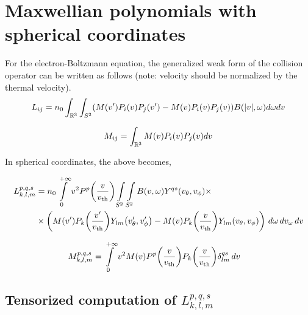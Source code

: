 \documentclass{article}
\newcommand{\myint}{\int\limits}
\newcommand{\diff}[1]{\, d#1}
\newcommand{\of}[1]{\mleft( #1 \mright)}
\newcommand{\vth}{v_\textrm{th}}
\begin{document}

\section{Maxwellian polynomials with spherical coordinates}

For the electron-Boltzmann equation, the generalized weak form of the collision operator can be written as follows (note: velocity should be normalized by the thermal velocity).
\begin{equation}
    L_{ij} = n_0 \int_{\mathbb{R}^3} \int_{S^2} (M(v^\prime) P_i(v)P_j(v^\prime)  - M(v) P_i(v) P_j(v) )  B(|v|,\omega) d\omega dv \label{eq:cOp}
\end{equation}

\begin{equation}
    M_{ij} = \int_{\mathbb{R}^3} M(v) P_i(v)P_j(v) dv
\end{equation}

In spherical coordinates, the above becomes, 

\begin{align*}
    {L}_{k,l,m}^{p,q,s} &=n_0
    \myint_{0}^{+\infty} 
    v^2
    P^p \of{\frac{v}{\vth}} 
    \myint_{S^2}^{}
    \myint_{S^2}^{}
    B\of{v,\omega} Y^{qs}\of{v_\theta, v_\phi} 
     \times
    \\
    & \times
    \left(
    M\of{v^\prime} P_k\of{\frac{v^\prime}{\vth}} Y_{lm}\of{v_\theta^\prime, v_\phi^\prime}
    -
    M\of{v} P_k\of{\frac{v}{\vth}} Y_{lm}\of{v_\theta, v_\phi}
    \right)
    \diff{\omega}
    \diff{v_\omega}
    \diff{v} 
\end{align*}

\begin{align*}
    {M}_{k,l,m}^{p,q,s} &=
    \myint_{0}^{+\infty} 
    v^2
    M\of{v} P^p \of{\frac{v}{\vth}}  P_k \of{\frac{v}{\vth}} \delta^{qs}_{lm}
    \diff{v} 
\end{align*}

\subsection{Tensorized computation of ${L}_{k,l,m}^{p,q,s}$}
\end{document}
